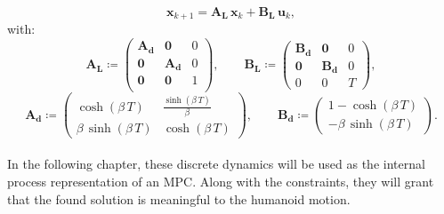 \begin{equation}\label{eq:lip_dyanmics}
\mathbf{x}_{k+1} = \mathbf{A_L} \, \mathbf{x}_k + \mathbf{B_L} \, \mathbf{u}_k,
\end{equation}
with:
$$
\mathbf{A_L} \coloneqq 
\begin{pmatrix}
\mathbf{A_d} & \mathbf{0} & 0 \\
\mathbf{0} & \mathbf{A_d} & 0 \\
\mathbf{0} & \mathbf{0} & 1 \\
\end{pmatrix}, \qquad
\mathbf{B_L} \coloneqq 
\begin{pmatrix}
\mathbf{B_d} & \mathbf{0} & 0 \\
\mathbf{0} & \mathbf{B_d} & 0 \\
0 & 0 & T
\end{pmatrix},
$$
$$
\mathbf{A_d} \coloneqq 
\begin{pmatrix}
\cosh(\beta \, T) & \frac{\sinh(\beta \, T)}{\beta}  \\
\beta \, \sinh(\beta \, T) & \cosh(\beta \, T)
\end{pmatrix}, \qquad
\mathbf{B_d} \coloneqq 
\begin{pmatrix}
1 - \cosh(\beta \, T) \\
-\beta \, \sinh(\beta \, T)
\end{pmatrix}.
$$
\\
In the following chapter, these discrete dynamics will be used as the internal process representation of an MPC. Along with the constraints, they will grant that the found solution is meaningful to the humanoid motion.
